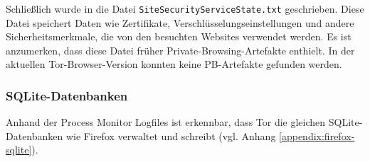\begin{appendices}
Schließlich wurde in die Datei \texttt{SiteSecurityServiceState.txt} geschrieben.
Diese Datei speichert Daten wie Zertifikate, Verschlüsselungseinstellungen und andere Sicherheitsmerkmale, die von den besuchten Websites verwendet werden.
Es ist anzumerken, dass diese Datei früher Private-Browsing-Artefakte enthielt. \cite{Gitlab.05.06.2023} In der aktuellen Tor-Browser-Version konnten keine PB-Artefakte gefunden werden.
	
\subsubsection*{SQLite-Datenbanken} 
Anhand der Process Monitor Logfiles ist erkennbar, dass Tor die gleichen SQLite-Datenbanken wie Firefox verwaltet und schreibt (vgl. Anhang \ref{appendix:firefox-sqlite}).
			

\end{appendices}
